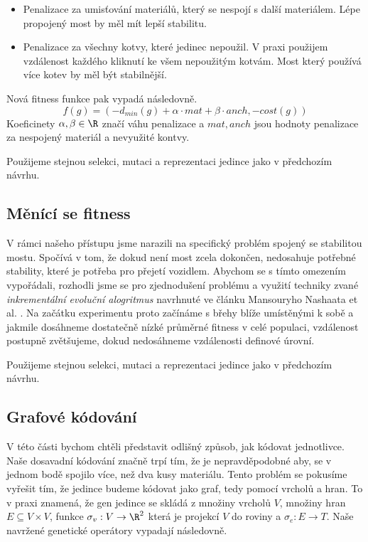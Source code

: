 \begin{itemize}
    \item Penalizace za umisťování materiálů, který se nespojí s další materiálem. Lépe propojený most by měl mít lepší stabilitu.
    \item Penalizace za všechny kotvy, které jedinec nepoužil. V praxi použijem vzdálenost každého kliknutí ke všem nepoužitým kotvám. Most který používá více kotev by měl být stabilnější.
\end{itemize}

Nová fitness funkce pak vypadá následovně. $$f(g) = (-d_{min}(g) + \alpha \cdot mat + \beta \cdot anch, -cost(g))$$ Koeficinety $\alpha, \beta \in \R$ značí váhu penalizace a $mat, anch$ jsou hodnoty penalizace za nespojený materiál a nevyužité kontvy.

Použijeme stejnou selekci, mutaci a reprezentaci jedince jako v předchozím návrhu.

\subsection{Měnící se fitness}

V rámci našeho přístupu jsme narazili na specifický problém spojený se stabilitou mostu. Spočívá v tom, že dokud není most zcela dokončen, nedosahuje potřebné stability, které je potřeba pro přejetí vozidlem. Abychom se s tímto omezením vypořádali, rozhodli jsme se pro zjednodušení problému a využití techniky zvané \emph{inkrementální evoluční alogritmus} navrhnuté ve článku Mansouryho Nashaata et al. \cite{IGA}. Na začátku experimentu proto začínáme s břehy blíže umístěnými k sobě a jakmile dosáhneme dostatečně nízké průměrné fitness v celé populaci, vzdálenost postupně zvětšujeme, dokud nedosáhneme vzdálenosti definové úrovní. 

Použijeme stejnou selekci, mutaci a reprezentaci jedince jako v předchozím návrhu.

\subsection{Grafové kódování}

V této části bychom chtěli představit odlišný způsob, jak kódovat jednotlivce. Naše dosavadní kódování značně trpí tím, že je nepravděpodobné aby, se v jednom bodě spojilo více, než dva kusy materiálu. Tento problém se pokusíme vyřešit tím, že jedince budeme kódovat jako graf, tedy pomocí vrcholů a hran. To v praxi znamená, že gen jedince se skládá z množiny vrcholů $V$, množiny hran $E \subseteq V \times V$, funkce $\sigma_v : V \rightarrow \R^2$ která je projekcí $V$ do roviny a $\sigma_e : E \rightarrow T$. Naše navržené genetické operátory vypadají následovně.


